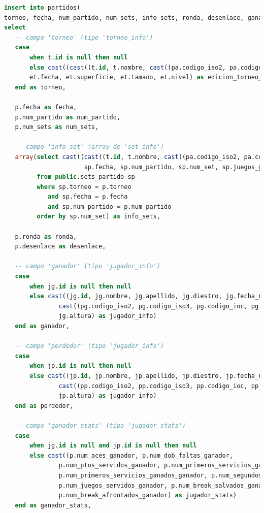 \documentclass[10pt]{opticajnl}
\begin{document}
\begin{lstlisting}[language=SQL]
insert into partidos(
torneo, fecha, num_partido, num_sets, info_sets, ronda, desenlace, ganador, perdedor, ganador_stats, perdedor_stats)
select
   -- campo 'torneo' (tipo 'torneo_info')
   case
       when t.id is null then null
       else cast((cast((t.id, t.nombre, cast((pa.codigo_iso2, pa.codigo_iso3, pa.codigo_ioc, pa.nombre) as pais_info)) as torneo_info), 
       et.fecha, et.superficie, et.tamano, et.nivel) as edicion_torneo_info)
   end as torneo,
  
   p.fecha as fecha,
   p.num_partido as num_partido,
   p.num_sets as num_sets,
  
   -- campo 'info_set' (array de 'set_info')
   array(select cast((cast((t.id, t.nombre, cast((pa.codigo_iso2, pa.codigo_iso3, pa.codigo_ioc, pa.nombre) as pais_info)) as torneo_info),
                      sp.fecha, sp.num_partido, sp.num_set, sp.juegos_ganador, sp.juegos_perdedor, sp.puntos_tiebreak_perdedor) as set_info)
         from public.sets_partido sp
         where sp.torneo = p.torneo
         	and sp.fecha = p.fecha
         	and sp.num_partido = p.num_partido
         order by sp.num_set) as info_sets,
  
   p.ronda as ronda,
   p.desenlace as desenlace,
  
   -- campo 'ganador' (tipo 'jugador_info')
   case
       when jg.id is null then null
       else cast((jg.id, jg.nombre, jg.apellido, jg.diestro, jg.fecha_nacimiento,
       		   cast((pg.codigo_iso2, pg.codigo_iso3, pg.codigo_ioc, pg.nombre) as pais_info),
       		   jg.altura) as jugador_info)
   end as ganador,
  
   -- campo 'perdedor' (tipo 'jugador_info')
   case
       when jp.id is null then null
       else cast((jp.id, jp.nombre, jp.apellido, jp.diestro, jp.fecha_nacimiento,
       		   cast((pp.codigo_iso2, pp.codigo_iso3, pp.codigo_ioc, pp.nombre) as pais_info),
       		   jp.altura) as jugador_info)
   end as perdedor,
  
   -- campo 'ganador_stats' (tipo 'jugador_stats')
   case
       when jg.id is null and jp.id is null then null
       else cast((p.num_aces_ganador, p.num_dob_faltas_ganador,
           	   p.num_ptos_servidos_ganador, p.num_primeros_servicios_ganador,
           	   p.num_primeros_servicios_ganados_ganador, p.num_segundos_servicios_ganados_ganador,
           	   p.num_juegos_servidos_ganador, p.num_break_salvados_ganador,
           	   p.num_break_afrontados_ganador) as jugador_stats)
   end as ganador_stats,
  

\end{lstlisting}
\end{document}
